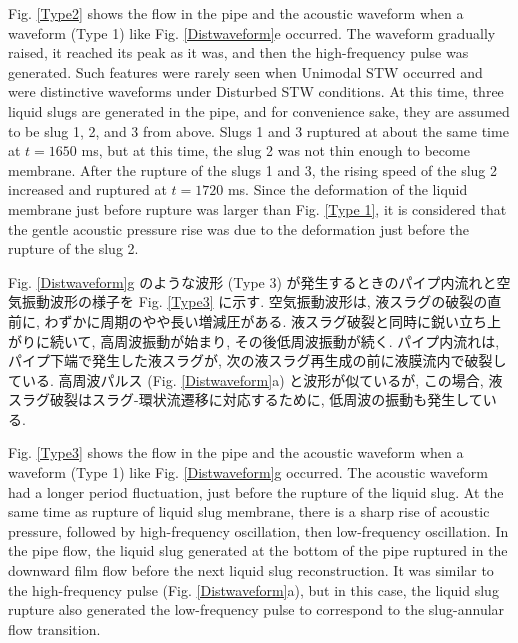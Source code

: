 \documentclass[12pt]{article}
\begin{document}
Fig. \ref{Type2} shows the flow in the pipe and the acoustic waveform when a waveform (Type 1) like Fig. \ref {Distwaveform}e occurred.
The waveform gradually raised, it reached its peak as it was, and then the high-frequency pulse was generated.
Such features were rarely seen when Unimodal STW occurred and were distinctive waveforms under Disturbed STW conditions.
At this time, three liquid slugs are generated in the pipe, and for convenience sake, they are assumed to be slug 1, 2, and 3 from above.
Slugs 1 and 3 ruptured at about the same time at $ t = 1650 $ ms, but at this time, the slug 2 was not thin enough to become membrane.
After the rupture of the slugs 1 and 3, the rising speed of the slug 2 increased and ruptured at $ t = 1720 $ ms.
Since the deformation of the liquid membrane just before rupture was larger than Fig. \ref {Type 1}, it is considered that the gentle acoustic pressure rise was due to the deformation just before the rupture of the slug 2.

Fig. \ref{Distwaveform}g のような波形 (Type 3) が発生するときのパイプ内流れと空気振動波形の様子を Fig. \ref{Type3} に示す. 空気振動波形は, 液スラグの破裂の直前に, わずかに周期のやや長い増減圧がある. 
液スラグ破裂と同時に鋭い立ち上がりに続いて, 高周波振動が始まり, その後低周波振動が続く. 
パイプ内流れは, パイプ下端で発生した液スラグが, 次の液スラグ再生成の前に液膜流内で破裂している. 
高周波パルス (Fig. \ref{Distwaveform}a) と波形が似ているが, この場合, 液スラグ破裂はスラグ-環状流遷移に対応するために, 低周波の振動も発生している.

Fig. \ref{Type3} shows the flow in the pipe and the acoustic waveform when a waveform (Type 1) like Fig. \ref {Distwaveform}g occurred. 
The acoustic waveform had a longer period fluctuation, just before the rupture of the liquid slug.
At the same time as rupture of liquid slug membrane, there is a sharp rise of acoustic pressure, followed by high-frequency oscillation, then low-frequency oscillation. 
In the pipe flow, the liquid slug generated at the bottom of the pipe ruptured in the downward film flow before the next liquid slug reconstruction.
It was similar to the high-frequency pulse (Fig. \ref{Distwaveform}a), but in this case, the liquid slug rupture also generated the low-frequency pulse to correspond to the slug-annular flow transition.

\clearpage
\end{document}
